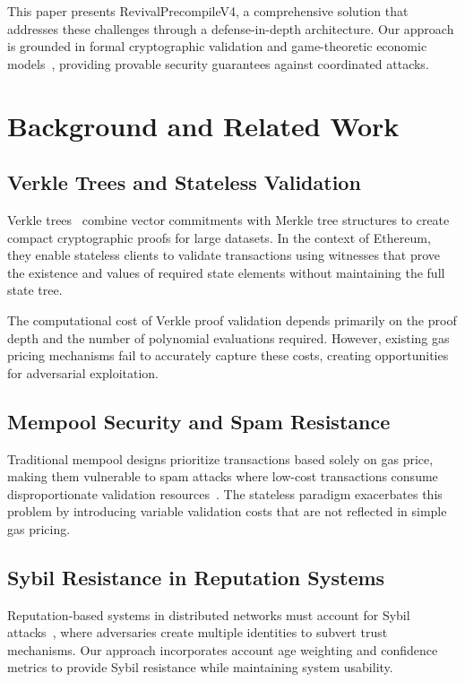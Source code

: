 \documentclass{article}
\begin{document}
This paper presents RevivalPrecompileV4, a comprehensive solution that addresses these challenges through a defense-in-depth architecture. Our approach is grounded in formal cryptographic validation and game-theoretic economic models~\cite{reynouard2024bar}, providing provable security guarantees against coordinated attacks.

\section{Background and Related Work}

\subsection{Verkle Trees and Stateless Validation}

Verkle trees~\cite{kuszmaul2018verkle} combine vector commitments with Merkle tree structures to create compact cryptographic proofs for large datasets. In the context of Ethereum, they enable stateless clients to validate transactions using witnesses that prove the existence and values of required state elements without maintaining the full state tree.

The computational cost of Verkle proof validation depends primarily on the proof depth and the number of polynomial evaluations required. However, existing gas pricing mechanisms fail to accurately capture these costs, creating opportunities for adversarial exploitation.

\subsection{Mempool Security and Spam Resistance}

Traditional mempool designs prioritize transactions based solely on gas price, making them vulnerable to spam attacks where low-cost transactions consume disproportionate validation resources~\cite{alqudah2019contra}. The stateless paradigm exacerbates this problem by introducing variable validation costs that are not reflected in simple gas pricing.

\subsection{Sybil Resistance in Reputation Systems}

Reputation-based systems in distributed networks must account for Sybil attacks~\cite{douceur2002sybil}, where adversaries create multiple identities to subvert trust mechanisms. Our approach incorporates account age weighting and confidence metrics to provide Sybil resistance while maintaining system usability.
\end{document}
